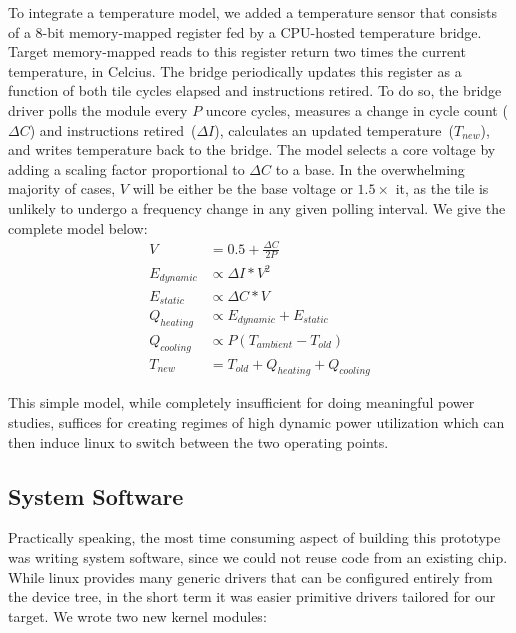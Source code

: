To integrate a temperature model, we added a temperature sensor that consists
of a 8-bit memory-mapped register fed by a CPU-hosted temperature bridge.
Target memory-mapped reads to this register return two times the current
temperature, in Celcius. The bridge periodically updates this register as a
function of both tile cycles elapsed and instructions retired. To do so, the
bridge driver polls the module every $P$ uncore cycles, measures a change in
cycle count ($\Delta C$) and instructions retired~($\Delta I$), calculates an
updated temperature~($T_{new}$), and writes temperature back to the bridge. The
model selects a core voltage by adding a scaling factor proportional to $\Delta
C$ to a base. In the overwhelming majority of cases, $V$ will be either be the
base voltage or $1.5\times$ it, as the tile is unlikely to undergo a frequency
change in any given polling interval. We give the complete model below:
\begin{equation}
\begin{split}
    V           & = 0.5 + \frac{\Delta C}{2P} \\
    E_{dynamic} & \propto \Delta I * V^2 \\
    E_{static}  & \propto \Delta C * V \\
    Q_{heating} & \propto E_{dynamic} + E_{static} \\
    Q_{cooling} & \propto P (T_{ambient} - T_{old}) \\
    T_{new}     & = T_{old} + Q_{heating} + Q_{cooling}
\end{split}
\end{equation}


This simple model, while completely insufficient for doing meaningful power
studies, suffices for creating regimes of high dynamic power utilization which
can then induce linux to switch between the two operating points.

\subsection{System Software}
Practically speaking, the most time consuming aspect of building this prototype
was writing system software, since we could not reuse code from an
existing chip. While linux provides many generic drivers that can be
configured entirely from the device tree, in the short term it was easier
primitive drivers tailored for our target. We wrote two new kernel modules:

